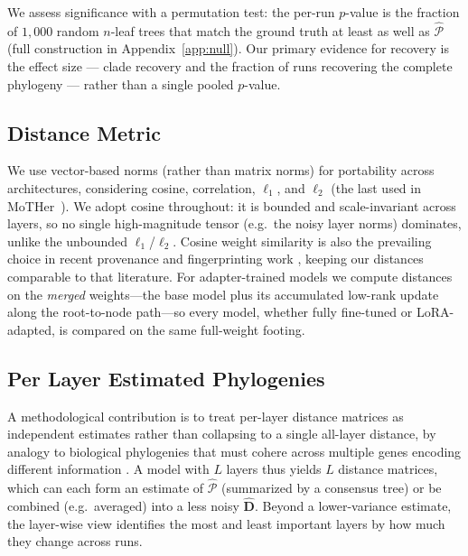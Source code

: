 \documentclass{article}
\theoremstyle{definition}
\theoremstyle{plain}
\begin{document}
We assess significance with a permutation test: the per-run $p$-value is the fraction of $1{,}000$
random $n$-leaf trees that match the ground truth at least as well as $\widehat{\mathcal{P}}$
(full construction in Appendix~\ref{app:null}). Our primary evidence for recovery is the effect size ---
clade recovery and the fraction of runs recovering the complete phylogeny --- rather than a single
pooled $p$-value.



\subsection{Distance Metric}
\label{sec:framework:metric}

We use vector-based norms (rather than matrix norms) for portability across architectures, considering
cosine, correlation, $\ell_1$, and $\ell_2$ (the last used in MoTHer~\citep{horwitz2025mother}). We
adopt cosine throughout: it is bounded and scale-invariant across layers, so no single high-magnitude
tensor (e.g.\ the noisy layer norms) dominates, unlike the unbounded $\ell_1$/$\ell_2$. Cosine weight
similarity is also the prevailing choice in recent provenance and fingerprinting work
\citep{zeng2024huref, behavioral2026provenance, zhu2025independence}, keeping our distances comparable
to that literature. For adapter-trained models we compute distances on the \emph{merged} weights---the
base model plus its accumulated low-rank update along the root-to-node path---so every model, whether
fully fine-tuned or LoRA-adapted, is compared on the same full-weight footing.





\subsection{Per Layer Estimated Phylogenies}
\label{sec:framework:layers}

A methodological contribution is to treat per-layer distance matrices as independent estimates rather
than collapsing to a single all-layer distance, by analogy to biological phylogenies that must cohere
across multiple genes encoding different information \citep{maddison1997gene}. A model with $L$ layers
thus yields $L$ distance matrices, which can each form an estimate of $\widehat{\mathcal{P}}$
(summarized by a consensus tree) or be combined (e.g.\ averaged) into a less noisy $\hat{\mathbf{D}}$.
Beyond a lower-variance estimate, the layer-wise view identifies the most and least important layers by
how much they change across runs.
\end{document}
